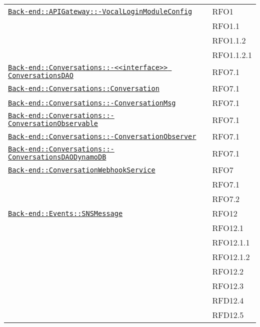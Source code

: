 \begin{longtable}{|>{\centering}m{10cm}|m{3cm}<{\centering}|}
\hyperref[Back-end::APIGateway::VocalLoginModuleConfig]{\texttt{Back-end::APIGateway::-\linebreak VocalLoginModuleConfig}} & RFO1\\
& RFO1.1\\
& RFO1.1.2\\
& RFO1.1.2.1\\ \hline

\hyperref[Back-end::Conversations::<<interface>> ConversationsDAO]{\texttt{Back-end::Conversations::-\linebreak <<interface>> ConversationsDAO}} & RFO7.1\\ \hline

\hyperref[Back-end::Conversations::Conversation]{\texttt{Back-end::Conversations::Conversation}} & RFO7.1\\ \hline

\hyperref[Back-end::Conversations::ConversationMsg]{\texttt{Back-end::Conversations::-\linebreak ConversationMsg}} & RFO7.1\\ \hline

\hyperref[Back-end::Conversations::ConversationObservable]{\texttt{Back-end::Conversations::-\linebreak ConversationObservable}} & RFO7.1\\ \hline

\hyperref[Back-end::Conversations::ConversationObserver]{\texttt{Back-end::Conversations::-\linebreak ConversationObserver}} & RFO7.1\\ \hline

\hyperref[Back-end::Conversations::ConversationsDAODynamoDB]{\texttt{Back-end::Conversations::-\linebreak ConversationsDAODynamoDB}} & RFO7.1\\ \hline

\hyperref[Back-end::ConversationWebhookService]{\texttt{Back-end::ConversationWebhookService}} & RFO7\\
& RFO7.1\\
& RFO7.2\\ \hline

\hyperref[Back-end::Events::SNSMessage]{\texttt{Back-end::Events::SNSMessage}} & RFO12\\
& RFO12.1\\
& RFO12.1.1\\
& RFO12.1.2\\
& RFO12.2\\
& RFO12.3\\
& RFD12.4\\
& RFD12.5\\ \hline


\end{longtable}
